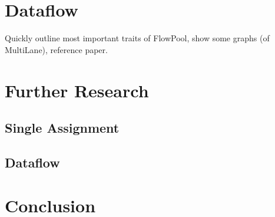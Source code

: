 \documentclass[fleqn]{scrartcl}
\begin{document}
\section{Dataflow}
Quickly outline most important traits of FlowPool, show some graphs
(of MultiLane), reference paper.

\section{Further Research}
\subsection{Single Assignment}
\subsection{Dataflow}

\section{Conclusion}

\nocite{*}

{}

\end{document}
